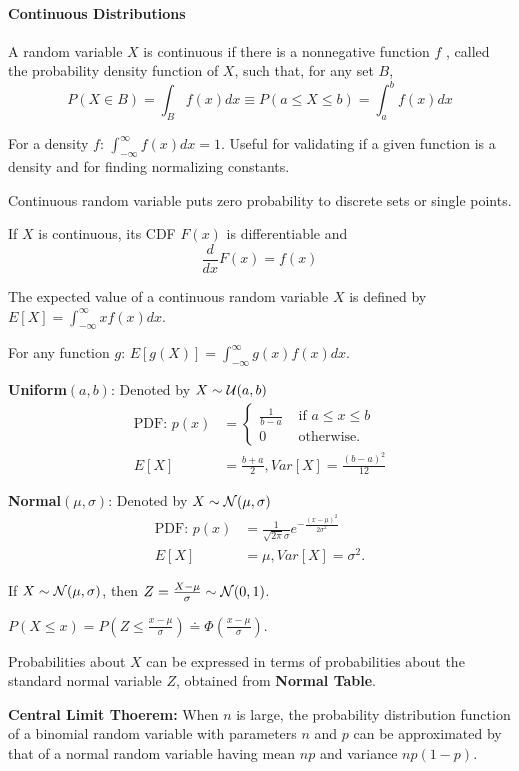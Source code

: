 \documentclass[10pt,twocolumn]{article}
\numberwithin{equation}{section}
\begin{document}
\paragraph{Continuous Distributions}
\ben 
\item A random variable $X$ is continuous if there is a nonnegative function $f$ , called the probability density function of $X$, such that, for any set $B$,
\[
P( X \in B) = \int_B f(x) dx \equiv P(a \le X \le b) = \int_{a}^{b} f(x) dx
\]
\item For a density $f$: $\int_{-\infty}^{\infty} f(x) dx = 1$. Useful for validating if a given function is a density and for finding normalizing constants. 
\item Continuous random variable puts zero probability to discrete sets or single points. 
\item If $X$ is continuous, its CDF $F(x)$ is differentiable and 
\[
\frac{d}{dx}F(x) = f(x) 
\]
\item The expected value of a continuous random variable $X$ is defined by
$E[X] = \int_{-\infty}^{\infty} xf(x) dx$.
\item For any function $g$: $E[g(X)] = \int_{-\infty}^{\infty} g(x) f(x) dx$. 
\item \textbf{Uniform$(a,b)$}: Denoted by $X \sim \mathcal{U}(a,b)$
\begin{align*}
\text{PDF: } p(x) &= \begin{cases} \frac{1}{b-a} &\text{ if } a \le x \le b \\
0 &\text{ otherwise}.
\end{cases} \\
E[X] & = \frac{b+a}{2}, Var[X] = \frac{(b-a)^2}{12} 
\end{align*}
\item \textbf{Normal$(\mu,\sigma)$}: Denoted by $X \sim \mathcal{N}(\mu,\sigma)$
\begin{align*}
\text{PDF: } p(x) &= \frac{1}{\sqrt{2\pi} \sigma} e^{-\frac{(x-\mu)^2}{2\sigma^2}} \\
E[X] & = \mu, Var[X] = \sigma^2. 
\end{align*}
\item If $X \sim \mathcal{N}(\mu,\sigma)$, then $Z = \frac{X-\mu}{\sigma} \sim \mathcal{N}(0,1)$. 
\item $P(X \le x) = P(Z \le \frac{x-\mu}{\sigma}) \doteq \Phi(\frac{x-\mu}{\sigma})$.
\item Probabilities about $X$ can be expressed in terms of probabilities about the standard normal variable $Z$, obtained from \textbf{Normal Table}.
\item \textbf{Central Limit Thoerem:} When $n$ is large, the probability distribution function of a binomial random variable with parameters $n$ and $p$ can be approximated by that of a normal random variable having mean $np$ and variance $np(1 − p)$. 
\een
\end{document}
